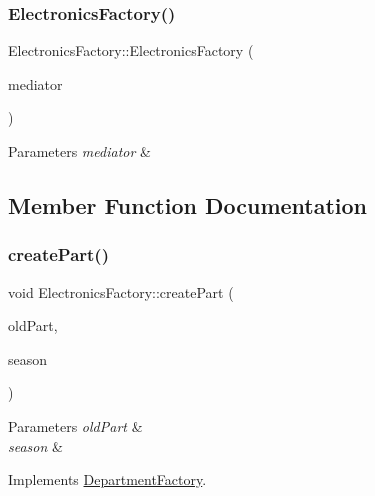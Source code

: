 \subsubsection{\texorpdfstring{Electronics\+Factory()}{ElectronicsFactory()}}
{\footnotesize\ttfamily Electronics\+Factory\+::\+Electronics\+Factory (\begin{DoxyParamCaption}\item[{\hyperlink{classDepartmentMediator}{Department\+Mediator} $\ast$}]{mediator }\end{DoxyParamCaption})}


\begin{DoxyParams}{Parameters}
{\em mediator} & \\
\hline
\end{DoxyParams}


\subsection{Member Function Documentation}
\mbox{\label{classElectronicsFactory_a6489d0e612615f65d76620585a67ff38}} 
\subsubsection{\texorpdfstring{create\+Part()}{createPart()}}
{\footnotesize\ttfamily void Electronics\+Factory\+::create\+Part (\begin{DoxyParamCaption}\item[{\hyperlink{classDepartmentOutput}{Department\+Output} $\ast$}]{old\+Part,  }\item[{string}]{season }\end{DoxyParamCaption})\hspace{0.3cm}{\ttfamily [virtual]}}


\begin{DoxyParams}{Parameters}
{\em old\+Part} & \\
\hline
{\em season} & \\
\hline
\end{DoxyParams}


Implements \hyperlink{classDepartmentFactory_a6080a560efb9fe0b9c870db5a7358886}{Department\+Factory}.

\mbox{\label{classElectronicsFactory_a494fea1f1a55bca20ce1bb4c988d9d44}} 
